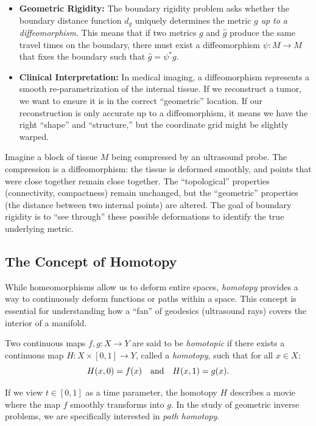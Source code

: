 \begin{itemize}
  \item \textbf{Geometric Rigidity:} The boundary rigidity problem asks whether the boundary distance function $d_g$ uniquely determines the metric $g$ \emph{up to a diffeomorphism}. This means that if two metrics $g$ and $\hat{g}$ produce the same travel times on the boundary, there must exist a diffeomorphism $\psi: M \to M$ that fixes the boundary such that $\hat{g} = \psi^* g$.
  \item \textbf{Clinical Interpretation:} In medical imaging, a diffeomorphism represents a smooth re-parametrization of the internal tissue. If we reconstruct a tumor, we want to ensure it is in the correct ``geometric'' location. If our reconstruction is only accurate up to a diffeomorphism, it means we have the right ``shape'' and ``structure,'' but the coordinate grid might be slightly warped.
\end{itemize}

\begin{example}
  Imagine a block of tissue $M$ being compressed by an ultrasound probe. The compression is a diffeomorphism: the tissue is deformed smoothly, and points that were close together remain close together. The ``topological'' properties (connectivity, compactness) remain unchanged, but the ``geometric'' properties (the distance between two internal points) are altered. The goal of boundary rigidity is to ``see through'' these possible deformations to identify the true underlying metric.
\end{example}

\subsection{The Concept of Homotopy} While homeomorphisms allow us to deform entire spaces, \emph{homotopy} provides a way to continuously deform functions or paths within a space. This concept is essential for understanding how a ``fan'' of geodesics (ultrasound rays) covers the interior of a manifold.

\begin{definition}
  Two continuous maps $f, g: X \to Y$ are said to be \emph{homotopic} if there exists a continuous map $H: X \times [0, 1] \to Y$, called a \emph{homotopy}, such that for all $x \in X$:
  \[%
    H(x, 0) = f(x) \aand H(x, 1) = g(x)
  .\]%
\end{definition}

If we view $t \in [0, 1]$ as a time parameter, the homotopy $H$ describes a movie where the map $f$ smoothly transforms into $g$. In the study of geometric inverse problems, we are specifically interested in \emph{path homotopy}.

